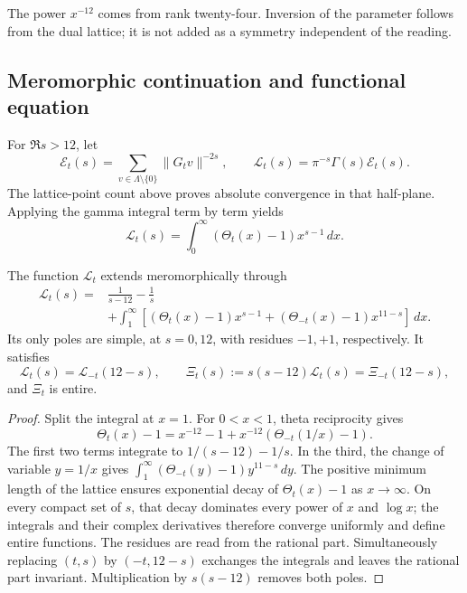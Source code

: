The power \(x^{-12}\) comes from rank twenty-four. Inversion of the parameter follows from the dual lattice; it is not added as a symmetry independent of the reading.

\subsection{Meromorphic continuation and functional equation}

For \(\Re s>12\), let
\begin{equation}
 \mathcal E_t(s)=\sum_{v\in\Lambda\setminus\{0\}}\|G_tv\|^{-2s},
 \qquad \mathcal L_t(s)=\pi^{-s}\Gamma(s)\mathcal E_t(s).
 \label{rec:eq:epstein}
\end{equation}
The lattice-point count above proves absolute convergence in that half-plane. Applying the gamma integral term by term yields
\[
 \mathcal L_t(s)=\int_0^\infty(\Theta_t(x)-1)x^{s-1}\,dx.
\]

\begin{theorem}
\label{rec:thm:mellin}
The function \(\mathcal L_t\) extends meromorphically through
\begin{align}
 \mathcal L_t(s)={}&\frac1{s-12}-\frac1s\nonumber\\
 &+\int_1^\infty\left[(\Theta_t(x)-1)x^{s-1}
                 +(\Theta_{-t}(x)-1)x^{11-s}\right]\,dx.
 \label{rec:eq:mellin-partida}
\end{align}
Its only poles are simple, at \(s=0,12\), with residues \(-1,+1\), respectively. It satisfies
\begin{equation}
 \mathcal L_t(s)=\mathcal L_{-t}(12-s),\qquad
 \Xi_t(s):=s(s-12)\mathcal L_t(s)=\Xi_{-t}(12-s),
 \label{rec:eq:funcional}
\end{equation}
and \(\Xi_t\) is entire.
\end{theorem}
\begin{proof}
Split the integral at \(x=1\). For \(0<x<1\), theta reciprocity gives
\[
 \Theta_t(x)-1=x^{-12}-1+x^{-12}(\Theta_{-t}(1/x)-1).
\]
The first two terms integrate to \(1/(s-12)-1/s\). In the third, the change of variable \(y=1/x\) gives
\(\int_1^\infty(\Theta_{-t}(y)-1)y^{11-s}\,dy\).
The positive minimum length of the lattice ensures exponential decay of \(\Theta_t(x)-1\) as \(x\to\infty\). On every compact set of \(s\), that decay dominates every power of \(x\) and \(\log x\); the integrals and their complex derivatives therefore converge uniformly and define entire functions. The residues are read from the rational part. Simultaneously replacing \((t,s)\) by \((-t,12-s)\) exchanges the integrals and leaves the rational part invariant. Multiplication by \(s(s-12)\) removes both poles.
\end{proof}

